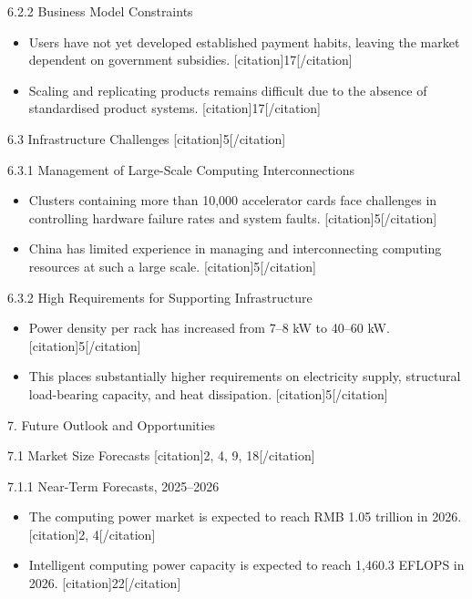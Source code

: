 \documentclass{huawei}
\begin{document}
\begin{tcolorbox}[
    title={Example of Hierarchical Research Outline},
    colback=gray!5,
    colframe=gray!40,
    fonttitle=\bfseries,
    boxrule=0.5pt,
    arc=2pt,
    breakable
]
\textcolor{TitleRed}{6.2.2 Business Model Constraints}
\begin{itemize}[leftmargin=1em, listparindent=\parindent]
\item Users have not yet developed established payment habits, leaving the market dependent on government subsidies. [citation]17[/citation]
\item Scaling and replicating products remains difficult due to the absence of standardised product systems. [citation]17[/citation]
\end{itemize}

\textcolor{TitleRed}{6.3 Infrastructure Challenges [citation]5[/citation]}

\textcolor{TitleRed}{6.3.1 Management of Large-Scale Computing Interconnections}
\begin{itemize}[leftmargin=1em, listparindent=\parindent]
\item Clusters containing more than 10,000 accelerator cards face challenges in controlling hardware failure rates and system faults. [citation]5[/citation]
\item China has limited experience in managing and interconnecting computing resources at such a large scale. [citation]5[/citation]
\end{itemize}

\textcolor{TitleRed}{6.3.2 High Requirements for Supporting Infrastructure}
\begin{itemize}[leftmargin=1em, listparindent=\parindent]
\item Power density per rack has increased from 7–8 kW to 40–60 kW. [citation]5[/citation]
\item This places substantially higher requirements on electricity supply, structural load-bearing capacity, and heat dissipation. [citation]5[/citation]
\end{itemize}

\textcolor{TitleRed}{7. Future Outlook and Opportunities}

\textcolor{TitleRed}{7.1 Market Size Forecasts [citation]2, 4, 9, 18[/citation]}

\textcolor{TitleRed}{7.1.1 Near-Term Forecasts, 2025–2026}
\begin{itemize}[leftmargin=1em, listparindent=\parindent]
\item The computing power market is expected to reach RMB 1.05 trillion in 2026. [citation]2, 4[/citation]
\item Intelligent computing power capacity is expected to reach 1,460.3 EFLOPS in 2026. [citation]22[/citation]
\end{itemize}


\end{tcolorbox}
\end{document}
